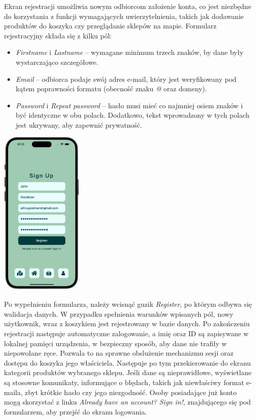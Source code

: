 Ekran rejestracji umożliwia nowym odbiorcom założenie konta, co jest niezbędne do korzystania z funkcji wymagających uwierzytelnienia, takich jak dodawanie produktów do koszyka czy przeglądanie sklepów na mapie. Formularz rejestracyjny składa się z kilku pól:
\begin{itemize} \item \textit{Firstname} i \textit{Lastname} – wymagane minimum trzech znaków, by dane były wystarczająco szczegółowe. \item \textit{Email} – odbiorca podaje swój adres e-mail, który jest weryfikowany pod kątem poprawności formatu (obecność znaku \textit{@} oraz domeny). \item \textit{Password} i \textit{Repeat password} – hasło musi mieć co najmniej osiem znaków i być identyczne w obu polach. Dodatkowo, tekst wprowadzony w tych polach jest ukrywany, aby zapewnić prywatność. \end{itemize}

\begin{center} 
    \includegraphics[width=0.3\textwidth]{images/front/register_page.png}
\end{center}

Po wypełnieniu formularza, należy wcisnąć guzik \textit{Register}, po którym odbywa się walidacja danych. W przypadku spełnienia warunków wpisanych pól, nowy użytkownik, wraz z koszykiem jest rejestrowany w bazie danych. Po zakończeniu rejestracji następuje automatyczne zalogowanie, a imię oraz ID są zapisywane w lokalnej pamięci urządzenia, w bezpieczny sposób, aby dane nie trafiły w niepowołane ręce. Pozwala to na sprawne obslużenie mechanizmu sesji oraz dostępu do koszyka jego właściciela. Następuje po tym przekierowanie do ekranu kategorii produktów wybranego sklepu. Jeśli dane są nieprawidłowe, wyświetlane są stosowne komunikaty, informujące o błędach, takich jak niewłaściwy format e-maila, zbyt krótkie hasło czy jego niezgodność. Osoby posiadające już konto mogą skorzystać z linku \textit{Already have an account? Sign in!}, znajdującego się pod formularzem, aby przejść do ekranu logowania. 

